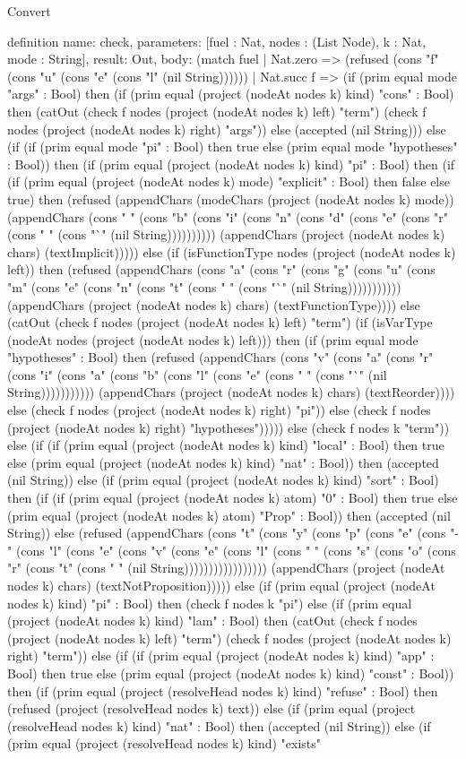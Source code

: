 \begin{lexlean}{Convert}
\begin{semanticmodule}
definition{
  name: check,
  parameters: [fuel : Nat, nodes : (List Node), k : Nat, mode : String],
  result: Out,
  body: (match fuel
    | Nat.zero => (refused (cons "f" (cons "u" (cons "e" (cons "l" (nil String))))))
    | Nat.succ f => (if (prim equal mode "args" : Bool) then (if (prim equal (project (nodeAt nodes k) kind) "cons" : Bool) then (catOut (check f nodes (project (nodeAt nodes k) left) "term") (check f nodes (project (nodeAt nodes k) right) "args")) else (accepted (nil String))) else (if (if (prim equal mode "pi" : Bool) then true else (prim equal mode "hypotheses" : Bool)) then (if (prim equal (project (nodeAt nodes k) kind) "pi" : Bool) then (if (if (prim equal (project (nodeAt nodes k) mode) "explicit" : Bool) then false else true) then (refused (appendChars (modeChars (project (nodeAt nodes k) mode)) (appendChars (cons " " (cons "b" (cons "i" (cons "n" (cons "d" (cons "e" (cons "r" (cons " " (cons "`" (nil String)))))))))) (appendChars (project (nodeAt nodes k) chars) (textImplicit))))) else (if (isFunctionType nodes (project (nodeAt nodes k) left)) then (refused (appendChars (cons "a" (cons "r" (cons "g" (cons "u" (cons "m" (cons "e" (cons "n" (cons "t" (cons " " (cons "`" (nil String))))))))))) (appendChars (project (nodeAt nodes k) chars) (textFunctionType)))) else (catOut (check f nodes (project (nodeAt nodes k) left) "term") (if (isVarType (nodeAt nodes (project (nodeAt nodes k) left))) then (if (prim equal mode "hypotheses" : Bool) then (refused (appendChars (cons "v" (cons "a" (cons "r" (cons "i" (cons "a" (cons "b" (cons "l" (cons "e" (cons " " (cons "`" (nil String))))))))))) (appendChars (project (nodeAt nodes k) chars) (textReorder)))) else (check f nodes (project (nodeAt nodes k) right) "pi")) else (check f nodes (project (nodeAt nodes k) right) "hypotheses"))))) else (check f nodes k "term")) else (if (if (prim equal (project (nodeAt nodes k) kind) "local" : Bool) then true else (prim equal (project (nodeAt nodes k) kind) "nat" : Bool)) then (accepted (nil String)) else (if (prim equal (project (nodeAt nodes k) kind) "sort" : Bool) then (if (if (prim equal (project (nodeAt nodes k) atom) "0" : Bool) then true else (prim equal (project (nodeAt nodes k) atom) "Prop" : Bool)) then (accepted (nil String)) else (refused (appendChars (cons "t" (cons "y" (cons "p" (cons "e" (cons "-" (cons "l" (cons "e" (cons "v" (cons "e" (cons "l" (cons " " (cons "s" (cons "o" (cons "r" (cons "t" (cons " " (nil String))))))))))))))))) (appendChars (project (nodeAt nodes k) chars) (textNotProposition))))) else (if (prim equal (project (nodeAt nodes k) kind) "pi" : Bool) then (check f nodes k "pi") else (if (prim equal (project (nodeAt nodes k) kind) "lam" : Bool) then (catOut (check f nodes (project (nodeAt nodes k) left) "term") (check f nodes (project (nodeAt nodes k) right) "term")) else (if (if (prim equal (project (nodeAt nodes k) kind) "app" : Bool) then true else (prim equal (project (nodeAt nodes k) kind) "const" : Bool)) then (if (prim equal (project (resolveHead nodes k) kind) "refuse" : Bool) then (refused (project (resolveHead nodes k) text)) else (if (prim equal (project (resolveHead nodes k) kind) "nat" : Bool) then (accepted (nil String)) else (if (prim equal (project (resolveHead nodes k) kind) "exists" }
\end{semanticmodule}
\end{lexlean}
